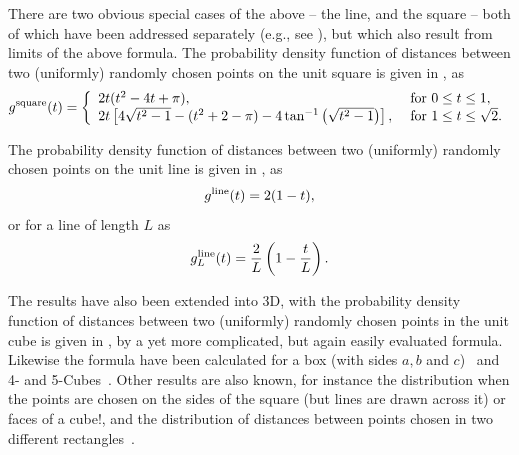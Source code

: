 \documentclass{article}
\begin{document}
There are two obvious special cases of the above -- the line, and the
square -- both of which have been addressed separately (e.g., see
\cite{philip:_probab_distr_distan_between_two,weisstein:_squar_line_picking}),
but which also result from limits of the above formula. The
probability density function of distances between two (uniformly)
randomly chosen points on the unit square is given in
\cite{weisstein:_squar_line_picking}, as
\begin{equation}
  \label{eq:square_line}
  g^{\rm square}(t) = \left\{ \begin{array}{ll}
      2t (t^2-4t+\pi), & \mbox{ for } 0 \leq t \leq 1, \\
      2t \left[4 \sqrt{t^2-1} - (t^2+2-\pi) - 4 \tan^{-1} \left(\sqrt{t^2-1} \right)\right], 
               & \mbox{ for } 1 \leq t \leq \sqrt{2} . \\ 
    \end{array} \right.
\end{equation}

The probability density function of distances between two (uniformly)
randomly chosen points on the unit line is given in
\cite{weisstein:_line_line_picking,b.ghosh51:_random_rect}, as
\begin{equation}
  \label{eq:line_line}
  g^{\rm line}(t) = 2(1-t),
\end{equation}
or for a line of length $L$ as
\begin{equation}
  \label{eq:line_line}
  g^{\rm line}_L(t) = \frac{2}{L} \left( 1-\frac{t}{L} \right).
\end{equation}

The results have also been extended into 3D, with the probability
density function of distances between two (uniformly) randomly chosen
points in the unit cube is given in
\cite{mathai99:_distan,weisstein:_cube_line_picking}, by a yet more
complicated, but again easily evaluated formula. Likewise the formula
have been calculated for a box (with sides $a,b$ and
$c$)~\cite{philip:_probab_distr_distan_between_two} and 4- and
5-Cubes~\cite{philip:_probab_distr_distan_between_two_4d}. Other
results are also known, for instance the distribution when the points
are chosen on the sides of the square (but lines are drawn across it)
or faces of a cube!\cite{mathai99:_distan}, and the distribution of
distances between points chosen in two different
rectangles~\cite{b.ghosh51:_random_rect}.
\end{document}
